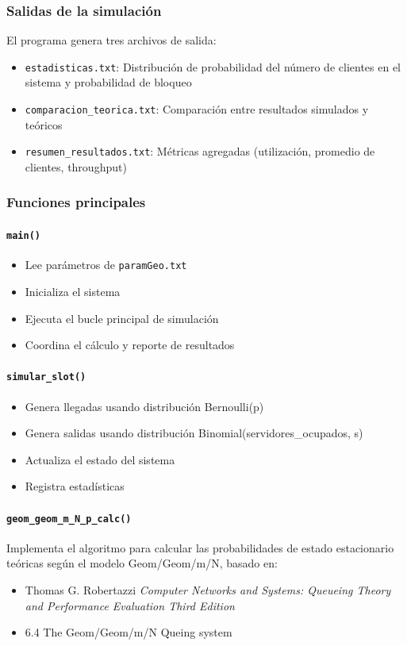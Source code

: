 \documentclass{article}
\begin{document}
\subsubsection{Salidas de la simulación}

El programa genera tres archivos de salida:

\begin{itemize}
    \item \texttt{estadisticas.txt}: Distribución de probabilidad del número de clientes en el sistema y probabilidad de bloqueo
    \item \texttt{comparacion\_teorica.txt}: Comparación entre resultados simulados y teóricos
    \item \texttt{resumen\_resultados.txt}: Métricas agregadas (utilización, promedio de clientes, throughput)
\end{itemize}

\subsubsection{Funciones principales}

\paragraph{\texttt{main()}}
\begin{itemize}
    \item Lee parámetros de \texttt{paramGeo.txt}
    \item Inicializa el sistema
    \item Ejecuta el bucle principal de simulación
    \item Coordina el cálculo y reporte de resultados
\end{itemize}

\paragraph{\texttt{simular\_slot()}}
\begin{itemize}
    \item Genera llegadas usando distribución Bernoulli(p)
    \item Genera salidas usando distribución Binomial(servidores\_ocupados, s)
    \item Actualiza el estado del sistema
    \item Registra estadísticas
\end{itemize}

\paragraph{\texttt{geom\_geom\_m\_N\_p\_calc()}}
Implementa el algoritmo para calcular las probabilidades de estado estacionario teóricas según el modelo Geom/Geom/m/N, basado en:
\begin{itemize}
    \item Thomas G. Robertazzi \textit{Computer Networks and Systems: Queueing Theory and Performance Evaluation Third Edition}
    \item 6.4 The Geom/Geom/m/N Queing system
\end{itemize}
\end{document}
